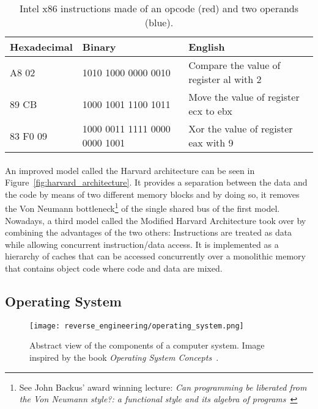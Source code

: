 \begin{table}[!htb]
	\centering
	\begin{tabular}{|l|l|l|}
		\hline
		Hexadecimal & Binary                        & English                               \\ \hline \hline
		\textcolor{bittersweet}{A8} \textcolor{bluegray}{02}   & \textcolor{bittersweet}{1010 1000} \textcolor{bluegray}{0000 0010}           & Compare the value of register al with 2 \\ \hline
		\textcolor{bittersweet}{89} \textcolor{bluegray}{CB}   & \textcolor{bittersweet}{1000 1001} \textcolor{bluegray}{1100 1011}           & Move the value of register ecx to ebx   \\ \hline
		\textcolor{bittersweet}{83} \textcolor{bluegray}{F0 09} & \textcolor{bittersweet}{1000 0011} \textcolor{bluegray}{1111 0000 0000 1001} & Xor the value of register eax with 9      \\ \hline
	\end{tabular}
	\caption{Intel x86 instructions made of an opcode (\textcolor{bittersweet}{red}) and two operands (\textcolor{bluegray}{blue}).}
	\label{table:hex_bin_english_lowl_level_instructions}
\end{table}

\paragraph{}
An improved model called the Harvard architecture can be seen in Figure~\ref{fig:harvard_architecture}. It provides a separation between the data and the code by means of two different memory blocks and by doing so, it removes the Von Neumann bottleneck\footnote{See John Backus' award winning lecture: \textit{Can programming be liberated from the Von Neumann style?: a functional style and its algebra of programs}~\cite{backus1978can}} of the single shared bus of the first model. Nowadays, a third model called the Modified Harvard Architecture took over by combining the advantages of the two others: Instructions are treated as data while allowing concurrent instruction/data access. It is implemented as a hierarchy of caches that can be accessed concurrently over a monolithic memory that contains object code where code and data are mixed.

\subsection{Operating System}
\begin{figure}[!htb]
	\centering
	\texttt{[image: reverse\_engineering/operating\_system.png]}
	\caption{Abstract view of the components of a computer system. Image inspired by the book \textit{Operating System Concepts}~\cite{Silberschatz:2012:OSC:2490781}.}
	\label{fig:operating_system}
\end{figure}

